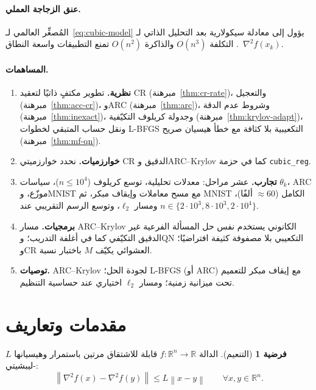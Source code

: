 \documentclass[11pt,a4paper]{article}
\theoremstyle{plain}
\theoremstyle{definition}
\newtheorem{assumption}[theorem]{فرضية}
\newcommand{\R}{\mathbb{R}}
\newcommand{\norm}[1]{\left\|#1\right\|}
\newcommand{\hess}{\nabla^{2}}
\begin{document}
\paragraph{عنق الزجاجة العملي.}
المُصغِّر العالمي لـ~\eqref{eq:cubic-model} يؤول إلى معادلة سيكولارية بعد التحليل الذاتي لـ $\hess f(x_{k})$~\cite{conn2000trust,cartis2011arc}. التكلفة $O(n^{3})$ والذاكرة $O(n^{2})$ تمنع التطبيقات واسعة النطاق.

\paragraph{المساهمات.}
\begin{enumerate}[leftmargin=*,itemsep=2pt]
  \item \textbf{نظرية.} تطوير مكتفٍ ذاتيًا لتعقيد CR (مبرهنة~\ref{thm:cr-rate})، والتعجيل (مبرهنة~\ref{thm:acc-cr})، وARC (مبرهنة~\ref{thm:arc})، وشروط عدم الدقة (مبرهنة~\ref{thm:inexact})، وجدولة كريلوف التكيّفية (مبرهنة~\ref{thm:krylov-adapt})، ونقل حساب المتبقي لخطوات L-BFGS التكعيبية بلا كثافة مع خطأ هيسيان صريح (مبرهنة~\ref{thm:mf-qn}).
  \item \textbf{خوارزميات.} نحدد خوارزميتي CR الدقيق وARC--Krylov كما في حزمة \textenglish{\texttt{cubic\_reg}}.
  \item \textbf{تجارب.} عشر مراحل: معدلات تحليلية، توسع كريلوف ($n\le 10^{4}$)، سياسات $\theta_{k}$، ARC موزّع، وMNIST مع مسح معاملات وإيقاف مبكر، ثم MNIST الكامل ($\approx 60$ ألفًا)، ومسار $\ell_{2}$، وتوسع الرسم التقريبي عند $n\in\{2{\cdot}10^{3},8{\cdot}10^{3},2{\cdot}10^{4}\}$.
  \item \textbf{برمجيات.} مسار ARC--Krylov الكانوني يستخدم نفس حل المسألة الفرعية غير الدقيق التكيّفي كما في أغلفة التدريب؛ وQN التكعيبي بلا مصفوفة كثيفة افتراضيًا؛ وCR العشوائي يكيّف $M$ باختبار نسبة.
  \item \textbf{توصيات.} ARC--Krylov لجودة الحل؛ L-BFGS (أو ARC) مع إيقاف مبكر للتعميم تحت ميزانية زمنية؛ ومسار $\ell_{2}$ اختياري عند حساسية التنظيم.
\end{enumerate}

\section{مقدمات وتعاريف}
\label{sec:prelim}

\begin{assumption}[التنعيم]
\label{ass:lipschitz-hess}
الدالة $f:\R^{n}\to\R$ قابلة للاشتقاق مرتين باستمرار وهيسيانها $L$-ليبشيتي:
\begin{equation}
\norm{\hess f(x)-\hess f(y)}
\le
L\norm{x-y}
\qquad\forall x,y\in\R^{n}.
\end{equation}
\end{assumption}
\end{document}

